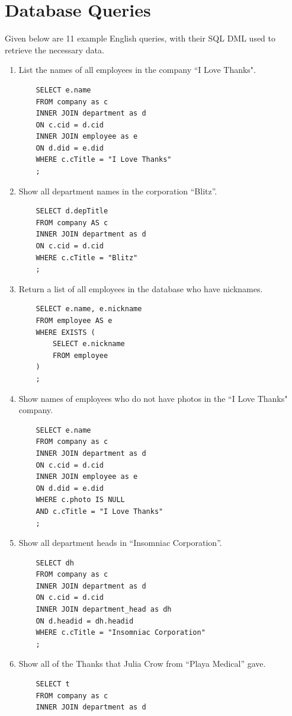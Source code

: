 \documentclass[11pt]{report}
\begin{document}
\section{Database Queries}
Given below are 11 example English queries, with their SQL DML used to retrieve the necessary data.
\begin{enumerate}
    \item List the names of all employees in the company ``I Love Thanks".
    \begin{verbatim}
    SELECT e.name
    FROM company as c
    INNER JOIN department as d
    ON c.cid = d.cid
    INNER JOIN employee as e
    ON d.did = e.did
    WHERE c.cTitle = "I Love Thanks"
    ;
    \end{verbatim}
    \item Show all department names in the corporation ``Blitz''.
    \begin{verbatim}
    SELECT d.depTitle
    FROM company AS c
    INNER JOIN department as d
    ON c.cid = d.cid
    WHERE c.cTitle = "Blitz"
    ;
    \end{verbatim}
    \item Return a list of all employees in the database who have nicknames.
    \begin{verbatim}
    SELECT e.name, e.nickname
    FROM employee AS e
    WHERE EXISTS (
        SELECT e.nickname
        FROM employee
    )
    ;
    \end{verbatim}
    \item Show names of employees who do not have photos in the ``I Love Thanks" company.
    \begin{verbatim}
    SELECT e.name
    FROM company as c
    INNER JOIN department as d
    ON c.cid = d.cid
    INNER JOIN employee as e
    ON d.did = e.did
    WHERE c.photo IS NULL
    AND c.cTitle = "I Love Thanks"
    ;
    \end{verbatim}
    \item Show all department heads in ``Insomniac Corporation''.
    \begin{verbatim}
    SELECT dh
    FROM company as c
    INNER JOIN department as d
    ON c.cid = d.cid
    INNER JOIN department_head as dh
    ON d.headid = dh.headid
    WHERE c.cTitle = "Insomniac Corporation"
    ;
    \end{verbatim}
    \item Show all of the Thanks that Julia Crow from ``Playa Medical'' gave.
    \begin{verbatim}
    SELECT t
    FROM company as c
    INNER JOIN department as d

\end{verbatim}
\end{enumerate}
\end{document}
